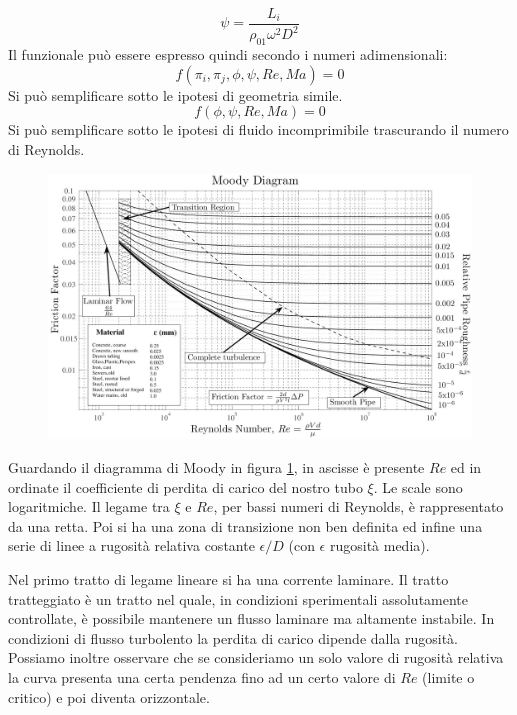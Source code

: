 \begin{equation}
\psi = \frac{L_i}{\rho_{01} \omega^2 D^2}
\end{equation}
Il funzionale può essere espresso quindi secondo i numeri adimensionali:
\begin{equation}
f(\pi_i,\pi_j,\phi,\psi,Re,Ma)=0
\end{equation}
Si può semplificare sotto le ipotesi di geometria simile.
\begin{equation}
f(\phi,\psi,Re,Ma)=0
\end{equation}
Si può semplificare sotto le ipotesi di fluido incomprimibile trascurando il numero di Reynolds.
\begin{figure}
\centering
  \includegraphics[width=\textwidth]{fig/moody.jpg}
\caption{}
\label{fig:moody}
\end{figure}
Guardando il diagramma di Moody in figura \ref{fig:moody}, in ascisse è presente $Re$ ed in ordinate il coefficiente di perdita di carico del nostro tubo $\xi$. Le scale sono logaritmiche. Il legame tra $\xi$ e $Re$, per bassi numeri di Reynolds, è rappresentato da una retta. Poi si ha una zona di transizione non ben definita ed infine una serie di linee a rugosità relativa costante $\epsilon/D$ (con $\epsilon$ rugosità media).

Nel primo tratto di legame lineare si ha una corrente laminare. Il tratto tratteggiato è un tratto nel quale, in condizioni sperimentali assolutamente controllate, è possibile mantenere un flusso laminare ma altamente instabile. In condizioni di flusso turbolento la perdita di carico dipende dalla rugosità.
Possiamo inoltre osservare che se consideriamo un solo valore di rugosità relativa la curva presenta una certa pendenza fino ad un certo valore di $Re$ (limite o critico) e poi diventa orizzontale.

